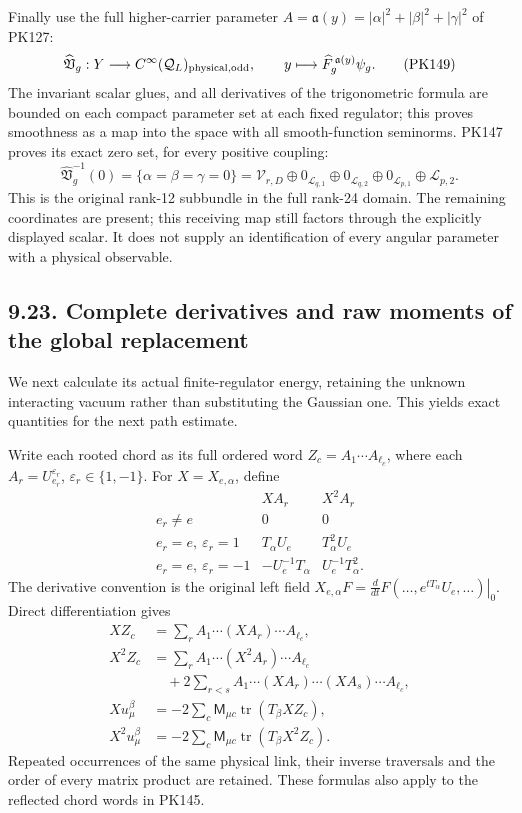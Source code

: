 \documentclass[11pt]{article}
\begin{document}
Finally use the full higher-carrier parameter
\(A=\mathfrak a(y)=|\alpha|^2+|\beta|^2+|\gamma|^2\) of PK127:
\[
 \widehat{\mathfrak V}_g:Y\longrightarrow
       C^\infty(\mathcal Q_L)_{\rm physical,odd},\qquad
 y\longmapsto\widehat F_g^{\,\mathfrak a(y)}\psi_g .
 \tag{PK149}
\]
The invariant scalar glues, and all derivatives of the trigonometric
formula are bounded on each compact parameter set at each fixed
regulator; this proves smoothness as a map into the space with all
smooth-function seminorms. PK147 proves its exact zero set, for
every positive coupling:
\[
 \widehat{\mathfrak V}_g^{-1}(0)
 =\{\alpha=\beta=\gamma=0\}
 =\mathcal V_{r,D}\oplus0_{\mathcal L_{q,1}}
       \oplus0_{\mathcal L_{q,2}}\oplus0_{\mathcal L_{p,1}}
       \oplus\mathcal L_{p,2}.
 \tag{PK150}
\]
This is the original rank-12 subbundle in the full rank-24 domain.
The remaining coordinates are present; this receiving map still
factors through the explicitly displayed scalar. It does not supply
an identification of every angular parameter with a physical observable.

\subsection*{9.23. Complete derivatives and raw moments of the global replacement}

We next calculate its actual finite-regulator energy, retaining the
unknown interacting vacuum rather than substituting the Gaussian one.
This yields exact quantities for the next path estimate.

Write each rooted chord as its full ordered word
\(Z_c=A_1\cdots A_{\ell_c}\), where each
\(A_r=U_{e_r}^{\varepsilon_r}\), \(\varepsilon_r\in\{1,-1\}\).
For \(X=X_{e,\alpha}\), define
\[
 \begin{array}{c|cc}
 &XA_r&X^2A_r\\ \hline
 e_r\ne e&0&0\\
 e_r=e,\ \varepsilon_r=1&T_\alpha U_e&T_\alpha^2U_e\\
 e_r=e,\ \varepsilon_r=-1&-U_e^{-1}T_\alpha&U_e^{-1}T_\alpha^2 .
 \end{array}\tag{PK151}
\]
The derivative convention is the original left field
\(X_{e,\alpha}F=\left.\frac d{dt}F(\ldots,e^{tT_\alpha}U_e,\ldots)\right|_0\).
Direct differentiation gives
\[
 \begin{split}
 XZ_c&=\sum_rA_1\cdots(XA_r)\cdots A_{\ell_c},\\
 X^2Z_c&=\sum_rA_1\cdots(X^2A_r)\cdots A_{\ell_c}\\
 &\quad+2\sum_{r<s}A_1\cdots(XA_r)\cdots(XA_s)\cdots A_{\ell_c},\\
 Xu_\mu^\beta&=-2\sum_c\mathsf M_{\mu c}
                         \operatorname{tr}(T_\beta XZ_c),\\
 X^2u_\mu^\beta&=-2\sum_c\mathsf M_{\mu c}
                         \operatorname{tr}(T_\beta X^2Z_c).
 \end{split}\tag{PK152}
\]
Repeated occurrences of the same physical link, their inverse
traversals and the order of every matrix product are retained.
These formulas also apply to the reflected chord words in PK145.
\end{document}
